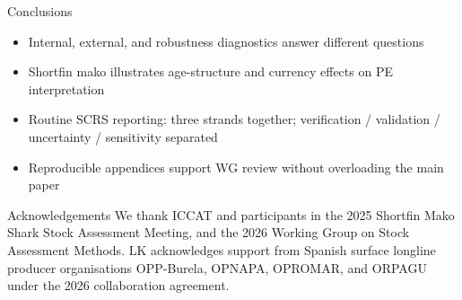 \documentclass[ignorenonframetext]{beamer}
\begin{document}
\begin{frame}{Conclusions}
  \begin{itemize}
    \item Internal, external, and robustness diagnostics answer different questions
    \item Shortfin mako illustrates age-structure and currency effects on PE interpretation
    \item Routine SCRS reporting: three strands together; verification / validation / uncertainty / sensitivity separated
    \item Reproducible appendices support WG review without overloading the main paper
  \end{itemize}
\end{frame}

\begin{frame}{Acknowledgements}
  \small
  We thank ICCAT and participants in the 2025 Shortfin Mako Shark Stock Assessment Meeting,
  and the 2026 Working Group on Stock Assessment Methods.
  LK acknowledges support from Spanish surface longline producer organisations OPP-Burela,
  OPNAPA, OPROMAR, and ORPAGU under the 2026 collaboration agreement.
\end{frame}
\end{document}
